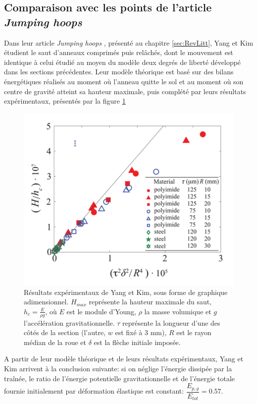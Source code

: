 \subsection{Comparaison avec les points de l'article \textit{Jumping hoops}}
Dans leur article \textit{Jumping hoops} \cite{yangkim}, présenté au chapitre \ref{sec:RevLitt}, Yang et Kim étudient le saut d'anneaux comprimés puis relâchés, dont le mouvement est identique à celui étudié au moyen du modèle deux degrés de liberté développé dans les sections précédentes.
Leur modèle théorique est basé sur des bilans énergétiques réalisés au moment où l'anneau quitte le sol et au moment où son centre de gravité atteint sa hauteur maximale, puis complété par leurs résultats expérimentaux, présentés par la figure \ref{fig:ykres}

\begin{figure}[htb]
\centering
\includegraphics[width=4.5in]{images_2ddl/ykres.png}
\caption{Résultats expérimentaux de Yang et Kim, sous forme de graphique adimensionnel. $H_{max}$ représente la hauteur maximale du saut, $h_c=\frac{E}{\rho g}$, où $E$ est le module d'Young, $\rho$ la masse volumique et $g$ l'accélération gravitationnelle. $\tau$ représente la longueur d'une des côtés de la section (l'autre, $w$ est fixé à 3 mm), $R$ est le rayon médian de la roue et $\delta$ est la flèche initiale imposée.}
\label{fig:ykres}
\end{figure}

A partir de leur modèle théorique et de leurs résultats expérimentaux, Yang et Kim arrivent à la conclusion suivante: si on néglige l'énergie dissipée par la traînée, le ratio de l'énergie potentielle gravitationnelle et de l'énergie totale fournie initialement par déformation élastique est constant: $\dfrac{E_{p,g}}{E_{tot}}=0.57$.

